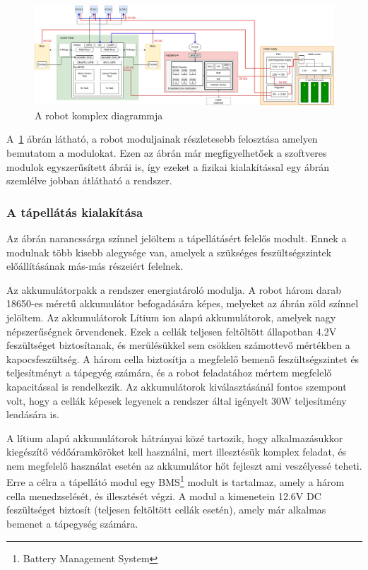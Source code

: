\begin{figure}
  \centering
  \includegraphics[width=150mm, keepaspectratio]{figures/ch2/robot-diagram-complex.png}
  \caption{A robot komplex diagrammja}
  \label{fig:robot-diagram-complex}
\end{figure}

\medskip

A~\ref{fig:robot-diagram-complex} ábrán látható, a robot moduljainak részletesebb
felosztása amelyen bemutatom a modulokat. Ezen az ábrán már megfigyelhetőek a
szoftveres modulok egyszerűsített ábrái is, így ezeket a fizikai kialakítással
egy ábrán szemlélve jobban átlátható a rendszer.

\subsubsection{A tápellátás kialakítása}
Az ábrán narancssárga színnel jelöltem a tápellátásért felelős modult. Ennek a
modulnak több kisebb alegysége van, amelyek a szükséges feszültségszintek
előállításának más-más részeiért felelnek.

\medskip

Az akkumulátorpakk a rendszer energiatároló modulja. A robot három darab 18650-es
méretű akkumulátor befogadására képes, melyeket az ábrán zöld színnel
jelöltem. Az akkumulátorok Lítium ion alapú akkumulátorok, amelyek nagy
népszerűségnek örvendenek. Ezek a cellák teljesen feltöltött állapotban 4.2V
feszültséget biztosítanak, és merülésükkel sem csökken számottevő mértékben a
kapocsfeszültség. A három cella biztosítja a megfelelő bemenő feszültségszintet
és teljesítményt a tápegyég számára, és a robot feladatához mértem megfelelő
kapacitással is rendelkezik. Az akkumulátorok kiválasztásánál fontos szempont
volt, hogy a cellák képesek legyenek a rendszer által igényelt 30W teljesítmény
leadására is.

\medskip

A lítium alapú akkumulátorok hátrányai közé tartozik, hogy alkalmazásukkor
kiegészítő védőáramköröket kell használni, mert illesztésük komplex feladat, és
nem megfelelő használat esetén az akkumulátor hőt fejleszt ami veszélyessé
teheti. Erre a célra a tápellátó modul egy BMS\footnote{Battery Management
System} modult is tartalmaz, amely a három cella menedzselését, és illesztését
végzi. A modul a kimenetein 12.6V DC feszültséget biztosít (teljesen feltöltött
cellák esetén), amely már alkalmas bemenet a tápegység számára.


